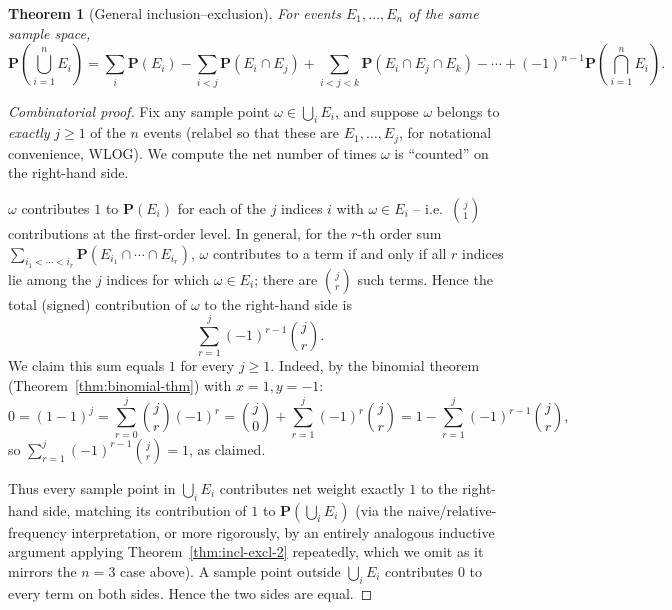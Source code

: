 \documentclass[11pt]{article}
\theoremstyle{definition}
\theoremstyle{plain}
\newtheorem{theorem}[definition]{Theorem}
\theoremstyle{remark}
\begin{document}
\begin{theorem}[General inclusion--exclusion]
\label{thm:incl-excl-n}
For events $E_1,\dots,E_n$ of the same sample space,
\[
\mathbf{P}\left(\bigcup_{i=1}^n E_i\right) = \sum_i \mathbf{P}(E_i) - \sum_{i<j}\mathbf{P}(E_i\cap E_j)
+ \sum_{i<j<k}\mathbf{P}(E_i\cap E_j\cap E_k) - \cdots + (-1)^{n-1}\mathbf{P}\left(\bigcap_{i=1}^n E_i\right).
\]
\end{theorem}
\begin{proof}[Combinatorial proof]
Fix any sample point $\omega \in \bigcup_i E_i$, and suppose $\omega$ belongs to \emph{exactly}
$j \ge 1$ of the $n$ events (relabel so that these are $E_1, \dots, E_j$, for notational
convenience, WLOG). We compute the net number of times $\omega$ is ``counted'' on the right-hand
side.

$\omega$ contributes $1$ to $\mathbf{P}(E_i)$ for each of the $j$ indices $i$ with $\omega \in E_i$
-- i.e.\ $\binom{j}{1}$ contributions at the first-order level. In general, for the $r$-th order
sum $\sum_{i_1<\cdots<i_r}\mathbf{P}(E_{i_1}\cap\cdots\cap E_{i_r})$, $\omega$ contributes to a term
if and only if all $r$ indices lie among the $j$ indices for which $\omega \in E_i$; there are
$\binom{j}{r}$ such terms. Hence the total (signed) contribution of $\omega$ to the right-hand side
is
\[
\sum_{r=1}^{j} (-1)^{r-1}\binom{j}{r}.
\]
We claim this sum equals $1$ for every $j \ge 1$. Indeed, by the binomial theorem
(Theorem~\ref{thm:binomial-thm}) with $x=1,y=-1$:
\[
0 = (1-1)^j = \sum_{r=0}^j \binom{j}{r}(-1)^r = \binom{j}{0} + \sum_{r=1}^j (-1)^r \binom{j}{r}
= 1 - \sum_{r=1}^j (-1)^{r-1}\binom{j}{r},
\]
so $\sum_{r=1}^j (-1)^{r-1}\binom{j}{r} = 1$, as claimed.

Thus every sample point in $\bigcup_i E_i$ contributes net weight exactly $1$ to the right-hand
side, matching its contribution of $1$ to $\mathbf{P}(\bigcup_i E_i)$ (via the naive/relative-
frequency interpretation, or more rigorously, by an entirely analogous inductive argument applying
Theorem~\ref{thm:incl-excl-2} repeatedly, which we omit as it mirrors the $n=3$ case above). A
sample point outside $\bigcup_i E_i$ contributes $0$ to every term on both sides. Hence the two
sides are equal.
\end{proof}
\end{document}

